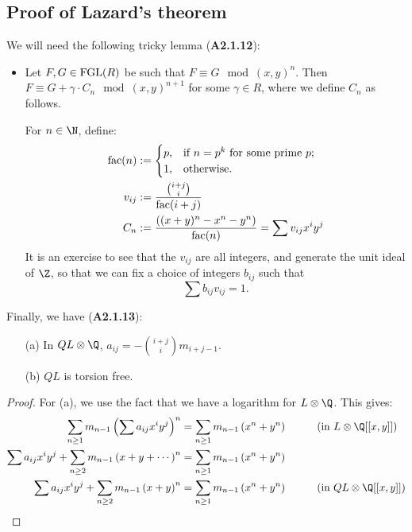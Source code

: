 \documentclass[11pt]{article}
\begin{document}
\begin{Formal Group Laws}
\subsection*{Proof of Lazard's theorem}
\begin{itemise}

\item We will need the following tricky lemma (\textbf{A2.1.12}):
\begin{itemize}\squishlist
\item Let $F,G\in\textup{FGL}(R)$ be such that $F\equiv G\mod{(x,y)^n}$. Then $F\equiv G+\gamma\cdot C_n\mod{(x,y)^{n+1}}$ for some $\gamma\in R$, where we define $C_n$ as follows.

\INDENT For $n\in\N$, define:
\begin{alignat*}{2}
\textup{fac}(n)&:=
\begin{cases}
p,&\textup{if }n=p^k\textup{ for some prime $p$};\\
1,&\textup{otherwise}.
\end{cases}%
\\
v_{ij}&:=
\frac{{i+j\choose i}}{\textup{fac}(i+j)}%
 \\
C_n&:=\frac{\left((x+y)^n-x^n-y^n\right)}{\textup{fac}(n)}=\sum v_{ij}x^iy^j
\end{alignat*}
It is an exercise to see that the $v_{ij}$ are all integers, and generate the unit ideal of $\Z$, so that we can fix a choice of integers $b_{ij}$ such that
\[\sum b_{ij}v_{ij}=1.\]
\end{itemize}
\item Finally, we have (\textbf{A2.1.13}):
\begin{enumerate}\squishlist
\item[(a)] In ${QL}\otimes{\Q}$, $a_{ij}=-{i+j\choose i} m_{i+j-1}$.
\item[(b)] $QL$ is torsion free.
\end{enumerate}
\begin{proof}
For (a), we use the fact that we have a logarithm for ${L}\otimes{\Q}$. This gives:
\begin{alignat*}{2}
\sum_{n\geq1}m_{n-1}\left(\sum a_{ij}x^iy^j\right)^n&=\sum_{n\geq1}m_{n-1} \left(x^n+y^n\right)&\qquad&\text{(in ${L}\otimes{\Q}[[x,y]]$)}
\\\sum a_{ij}x^iy^j+\sum_{n\geq2}m_{n-1} \left(x+y+\cdots\right)^n&=\sum_{n\geq1}m_{n-1} \left(x^n+y^n\right)
\\\sum a_{ij}x^iy^j+\sum_{n\geq2}m_{n-1} \left(x+y\right)^n&=\sum_{n\geq1}m_{n-1} \left(x^n+y^n\right)&\qquad&\text{(in ${QL}\otimes{\Q}[[x,y]]$)}

\end{alignat*}
\end{proof}
\end{itemise}
\end{Formal Group Laws}
\end{document}
